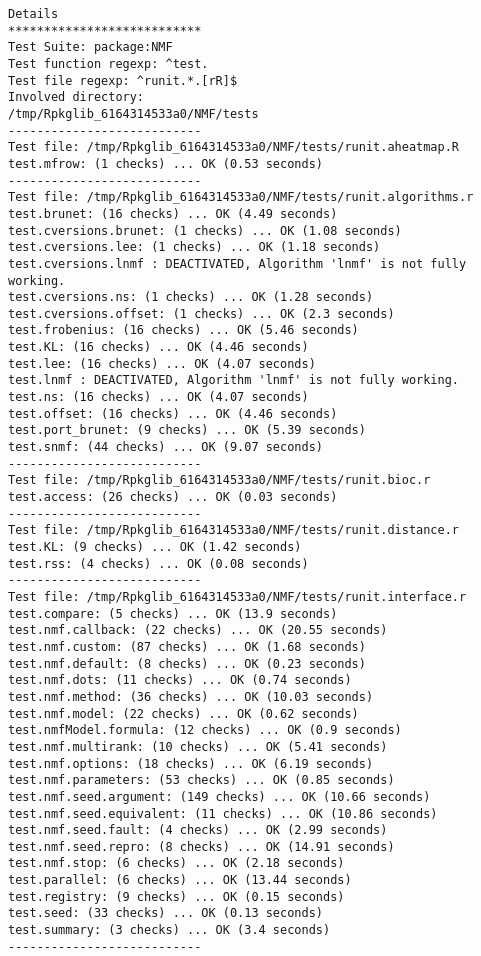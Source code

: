 \documentclass[10pt]{article}\usepackage[]{graphicx}\usepackage[]{color}
\begin{document}
\begin{verbatim}
Details 
*************************** 
Test Suite: package:NMF 
Test function regexp: ^test. 
Test file regexp: ^runit.*.[rR]$ 
Involved directory: 
/tmp/Rpkglib_6164314533a0/NMF/tests 
--------------------------- 
Test file: /tmp/Rpkglib_6164314533a0/NMF/tests/runit.aheatmap.R 
test.mfrow: (1 checks) ... OK (0.53 seconds)
--------------------------- 
Test file: /tmp/Rpkglib_6164314533a0/NMF/tests/runit.algorithms.r 
test.brunet: (16 checks) ... OK (4.49 seconds)
test.cversions.brunet: (1 checks) ... OK (1.08 seconds)
test.cversions.lee: (1 checks) ... OK (1.18 seconds)
test.cversions.lnmf : DEACTIVATED, Algorithm 'lnmf' is not fully working.
test.cversions.ns: (1 checks) ... OK (1.28 seconds)
test.cversions.offset: (1 checks) ... OK (2.3 seconds)
test.frobenius: (16 checks) ... OK (5.46 seconds)
test.KL: (16 checks) ... OK (4.46 seconds)
test.lee: (16 checks) ... OK (4.07 seconds)
test.lnmf : DEACTIVATED, Algorithm 'lnmf' is not fully working.
test.ns: (16 checks) ... OK (4.07 seconds)
test.offset: (16 checks) ... OK (4.46 seconds)
test.port_brunet: (9 checks) ... OK (5.39 seconds)
test.snmf: (44 checks) ... OK (9.07 seconds)
--------------------------- 
Test file: /tmp/Rpkglib_6164314533a0/NMF/tests/runit.bioc.r 
test.access: (26 checks) ... OK (0.03 seconds)
--------------------------- 
Test file: /tmp/Rpkglib_6164314533a0/NMF/tests/runit.distance.r 
test.KL: (9 checks) ... OK (1.42 seconds)
test.rss: (4 checks) ... OK (0.08 seconds)
--------------------------- 
Test file: /tmp/Rpkglib_6164314533a0/NMF/tests/runit.interface.r 
test.compare: (5 checks) ... OK (13.9 seconds)
test.nmf.callback: (22 checks) ... OK (20.55 seconds)
test.nmf.custom: (87 checks) ... OK (1.68 seconds)
test.nmf.default: (8 checks) ... OK (0.23 seconds)
test.nmf.dots: (11 checks) ... OK (0.74 seconds)
test.nmf.method: (36 checks) ... OK (10.03 seconds)
test.nmf.model: (22 checks) ... OK (0.62 seconds)
test.nmfModel.formula: (12 checks) ... OK (0.9 seconds)
test.nmf.multirank: (10 checks) ... OK (5.41 seconds)
test.nmf.options: (18 checks) ... OK (6.19 seconds)
test.nmf.parameters: (53 checks) ... OK (0.85 seconds)
test.nmf.seed.argument: (149 checks) ... OK (10.66 seconds)
test.nmf.seed.equivalent: (11 checks) ... OK (10.86 seconds)
test.nmf.seed.fault: (4 checks) ... OK (2.99 seconds)
test.nmf.seed.repro: (8 checks) ... OK (14.91 seconds)
test.nmf.stop: (6 checks) ... OK (2.18 seconds)
test.parallel: (6 checks) ... OK (13.44 seconds)
test.registry: (9 checks) ... OK (0.15 seconds)
test.seed: (33 checks) ... OK (0.13 seconds)
test.summary: (3 checks) ... OK (3.4 seconds)
--------------------------- 

\end{verbatim}
\end{document}
